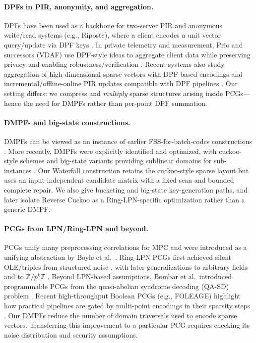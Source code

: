 \paragraph{DPFs in PIR, anonymity, and aggregation.}
DPFs have been used as a backbone for two-server PIR and anonymous write/read systems (e.g., Riposte), where a client encodes a unit vector query/update via DPF keys \cite{corrigan2015riposte}. In private telemetry and measurement, Prio and successors (VDAF) use DPF-style ideas to aggregate client data while preserving privacy and enabling robustness/verification \cite{prio,vdaf}. Recent systems also study aggregation of high-dimensional sparse vectors with DPF-based encodings \cite{asi2025preamble} and incremental/offline-online PIR updates compatible with DPF pipelines \cite{inc-offline-online-pir}. Our setting differs: we compress and \emph{multiply} sparse structures arising inside PCGs—hence the need for DMPFs rather than per-point DPF summation.

\paragraph{DMPFs and big-state constructions.}
DMPFs can be viewed as an instance of earlier FSS-for-batch-codes constructions \cite{fssBatchCodes}. More recently, DMPFs were explicitly identified and optimized, with cuckoo-style schemes and big-state variants providing sublinear domains for sub-instances \cite{dmpf}.  Our Waterfall construction retains the cuckoo-style sparse layout but uses an input-independent candidate matrix with a fixed scan and bounded complete repair.  We also give bucketing and big-state key-generation paths, and later isolate Reverse Cuckoo as a Ring-LPN-specific optimization rather than a generic DMPF.

\paragraph{PCGs from LPN/Ring-LPN and beyond.}
PCGs unify many preprocessing correlations for MPC and were introduced as a unifying abstraction by Boyle et al.\ \cite{pcg2019}. Ring-LPN PCGs first achieved silent OLE/triples from structured noise \cite{boyle2020efficient}, with later generalizations to arbitrary fields and to $\mathbb{Z}/p^k\mathbb{Z}$ \cite{anyField,pcgZ2k}. Beyond LPN-based assumptions, Bombar et al.\ introduced programmable PCGs from the quasi-abelian syndrome decoding (QA-SD) problem \cite{pcgQASD}. Recent high-throughput Boolean PCGs (e.g., FOLEAGE) highlight how practical pipelines are gated by multi-point encodings in their sparsity steps \cite{foleage}. Our DMPFs reduce the number of domain traversals used to encode sparse vectors. Transferring this improvement to a particular PCG requires checking its noise distribution and security assumptions.

